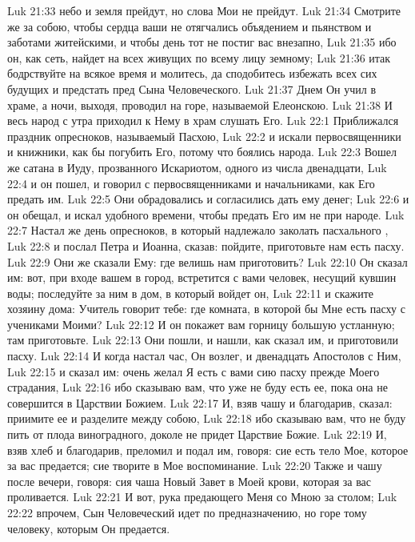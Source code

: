 \vs Luk 21:33 небо и земля прейдут, но слова Мои не прейдут.
\vs Luk 21:34 Смотрите же за собою, чтобы сердца ваши не отягчались объядением и пьянством и заботами житейскими, и чтобы день тот не постиг вас внезапно,
\vs Luk 21:35 ибо он, как сеть, найдет на всех живущих по всему лицу земному;
\vs Luk 21:36 итак бодрствуйте на всякое время и молитесь, да сподобитесь избежать всех сих будущих  и предстать пред Сына Человеческого.
\rsbpar\vs Luk 21:37 Днем Он учил в храме, а ночи, выходя, проводил на горе, называемой Елеонскою.
\vs Luk 21:38 И весь народ с утра приходил к Нему в храм слушать Его.
\vs Luk 22:1 Приближался праздник опресноков, называемый Пасхою,
\vs Luk 22:2 и искали первосвященники и книжники, как бы погубить Его, потому что боялись народа.
\vs Luk 22:3 Вошел же сатана в Иуду, прозванного Искариотом, одного из числа двенадцати,
\vs Luk 22:4 и он пошел, и говорил с первосвященниками и начальниками, как Его предать им.
\vs Luk 22:5 Они обрадовались и согласились дать ему денег;
\vs Luk 22:6 и он обещал, и искал удобного времени, чтобы предать Его им не при народе.
\rsbpar\vs Luk 22:7 Настал же день опресноков, в который надлежало заколать пасхального ,
\vs Luk 22:8 и послал  Петра и Иоанна, сказав: пойдите, приготовьте нам есть пасху.
\vs Luk 22:9 Они же сказали Ему: где велишь нам приготовить?
\vs Luk 22:10 Он сказал им: вот, при входе вашем в город, встретится с вами человек, несущий кувшин воды; последуйте за ним в дом, в который войдет он,
\vs Luk 22:11 и скажите хозяину дома: Учитель говорит тебе: где комната, в которой бы Мне есть пасху с учениками Моими?
\vs Luk 22:12 И он покажет вам горницу большую устланную; там приготовьте.
\vs Luk 22:13 Они пошли, и нашли, как сказал им, и приготовили пасху.
\rsbpar\vs Luk 22:14 И когда настал час, Он возлег, и двенадцать Апостолов с Ним,
\vs Luk 22:15 и сказал им: очень желал Я есть с вами сию пасху прежде Моего страдания,
\vs Luk 22:16 ибо сказываю вам, что уже не буду есть ее, пока она не совершится в Царствии Божием.
\vs Luk 22:17 И, взяв чашу и благодарив, сказал: приимите ее и разделите между собою,
\vs Luk 22:18 ибо сказываю вам, что не буду пить от плода виноградного, доколе не придет Царствие Божие.
\vs Luk 22:19 И, взяв хлеб и благодарив, преломил и подал им, говоря: сие есть тело Мое, которое за вас предается; сие творите в Мое воспоминание.
\vs Luk 22:20 Также и чашу после вечери, говоря: сия чаша  Новый Завет в Моей крови, которая за вас проливается.
\vs Luk 22:21 И вот, рука предающего Меня со Мною за столом;
\vs Luk 22:22 впрочем, Сын Человеческий идет по предназначению, но горе тому человеку, которым Он предается.
